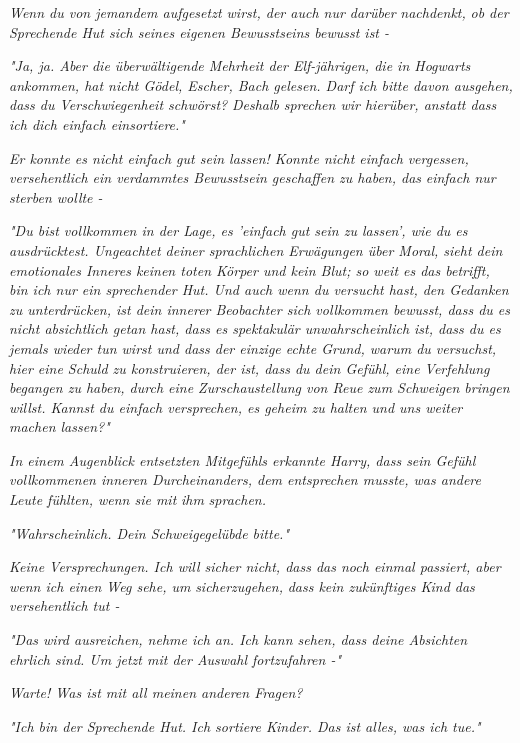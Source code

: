 {\emph{Wenn du von jemandem aufgesetzt wirst, der auch nur darüber} \emph{nachdenkt,} \emph{\emph{ob der Sprechende Hut sich seines eigenen Bewusstseins bewusst ist -}}

\emph{"Ja, ja. Aber die überwältigende Mehrheit der Elf-jährigen, die in Hogwarts ankommen, hat nicht Gödel, Escher, Bach gelesen. Darf ich bitte davon ausgehen, dass du Verschwiegenheit schwörst?} \emph{Deshalb} \emph{\emph{sprechen wir hierüber, anstatt dass ich dich einfach einsortiere."}}

\emph{Er konnte es nicht einfach gut sein lassen! Konnte nicht einfach} \emph{\emph{vergessen,}} \emph{versehentlich ein verdammtes Bewusstsein geschaffen zu haben, das} \emph{einfach nur sterben wollte -}

\emph{\emph{"Du bist vollkommen in der Lage, es 'einfach gut sein zu lassen', wie du es ausdrücktest. Ungeachtet deiner sprachlichen Erwägungen über Moral, sieht dein emotionales Inneres keinen toten Körper und kein Blut; so weit es das betrifft, bin ich nur ein sprechender Hut. Und auch wenn du versucht hast, den Gedanken zu unterdrücken, ist dein innerer Beobachter sich vollkommen bewusst, dass du es nicht absichtlich getan hast, dass es spektakulär unwahrscheinlich ist, dass du es jemals wieder tun wirst und dass der einzige echte Grund, warum du versuchst, hier eine Schuld zu konstruieren, der ist, dass du dein Gefühl, eine Verfehlung begangen zu haben, durch eine Zurschaustellung von Reue zum Schweigen bringen willst. Kannst du einfach versprechen, es geheim zu halten und uns weiter machen lassen?"}}

\emph{In einem Augenblick entsetzten Mitgefühls erkannte Harry, dass sein Gefühl vollkommenen inneren Durcheinanders, dem entsprechen musste, was andere Leute fühlten, wenn sie mit} \emph{\emph{ihm}} \emph{sprachen.}

\emph{"Wahrscheinlich. Dein Schweigegelübde bitte."}

\emph{Keine Versprechungen. Ich will sicher nicht, dass das noch einmal passiert, aber wenn ich einen Weg sehe, um} \emph{sicherzugehen,} \emph{\emph{dass kein zukünftiges Kind das versehentlich tut -}}

\emph{"Das wird ausreichen, nehme ich an. Ich kann sehen, dass deine Absichten ehrlich sind. Um jetzt mit der Auswahl fortzufahren -"}

\emph{Warte! Was ist mit all meinen anderen Fragen?}

\emph{"Ich bin der Sprechende Hut. Ich sortiere Kinder. Das ist alles, was ich tue."}

}

